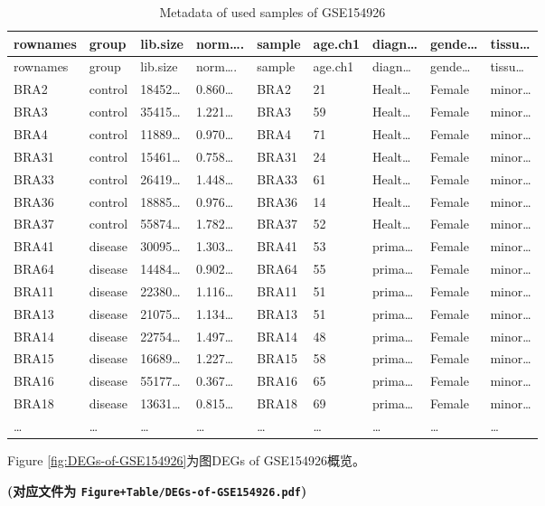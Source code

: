 \documentclass[
]{article}
\begin{document}
\begin{longtable}[]{@{}lllllllll@{}}
\caption{\label{tab:metadata-of-used-samples-of-GSE154926}Metadata of used samples of GSE154926}\tabularnewline
\toprule
rownames & group & lib.size & norm\ldots. & sample & age.ch1 & diagn\ldots{} & gende\ldots{} & tissu\ldots{}\tabularnewline
\midrule
\endfirsthead
\toprule
rownames & group & lib.size & norm\ldots. & sample & age.ch1 & diagn\ldots{} & gende\ldots{} & tissu\ldots{}\tabularnewline
\midrule
\endhead
BRA2 & control & 18452\ldots{} & 0.860\ldots{} & BRA2 & 21 & Healt\ldots{} & Female & minor\ldots{}\tabularnewline
BRA3 & control & 35415\ldots{} & 1.221\ldots{} & BRA3 & 59 & Healt\ldots{} & Female & minor\ldots{}\tabularnewline
BRA4 & control & 11889\ldots{} & 0.970\ldots{} & BRA4 & 71 & Healt\ldots{} & Female & minor\ldots{}\tabularnewline
BRA31 & control & 15461\ldots{} & 0.758\ldots{} & BRA31 & 24 & Healt\ldots{} & Female & minor\ldots{}\tabularnewline
BRA33 & control & 26419\ldots{} & 1.448\ldots{} & BRA33 & 61 & Healt\ldots{} & Female & minor\ldots{}\tabularnewline
BRA36 & control & 18885\ldots{} & 0.976\ldots{} & BRA36 & 14 & Healt\ldots{} & Female & minor\ldots{}\tabularnewline
BRA37 & control & 55874\ldots{} & 1.782\ldots{} & BRA37 & 52 & Healt\ldots{} & Female & minor\ldots{}\tabularnewline
BRA41 & disease & 30095\ldots{} & 1.303\ldots{} & BRA41 & 53 & prima\ldots{} & Female & minor\ldots{}\tabularnewline
BRA64 & disease & 14484\ldots{} & 0.902\ldots{} & BRA64 & 55 & prima\ldots{} & Female & minor\ldots{}\tabularnewline
BRA11 & disease & 22380\ldots{} & 1.116\ldots{} & BRA11 & 51 & prima\ldots{} & Female & minor\ldots{}\tabularnewline
BRA13 & disease & 21075\ldots{} & 1.134\ldots{} & BRA13 & 51 & prima\ldots{} & Female & minor\ldots{}\tabularnewline
BRA14 & disease & 22754\ldots{} & 1.497\ldots{} & BRA14 & 48 & prima\ldots{} & Female & minor\ldots{}\tabularnewline
BRA15 & disease & 16689\ldots{} & 1.227\ldots{} & BRA15 & 58 & prima\ldots{} & Female & minor\ldots{}\tabularnewline
BRA16 & disease & 55177\ldots{} & 0.367\ldots{} & BRA16 & 65 & prima\ldots{} & Female & minor\ldots{}\tabularnewline
BRA18 & disease & 13631\ldots{} & 0.815\ldots{} & BRA18 & 69 & prima\ldots{} & Female & minor\ldots{}\tabularnewline
\ldots{} & \ldots{} & \ldots{} & \ldots{} & \ldots{} & \ldots{} & \ldots{} & \ldots{} & \ldots{}\tabularnewline
\bottomrule
\end{longtable}

Figure \ref{fig:DEGs-of-GSE154926}为图DEGs of GSE154926概览。

\textbf{(对应文件为 \texttt{Figure+Table/DEGs-of-GSE154926.pdf})}
\end{document}
